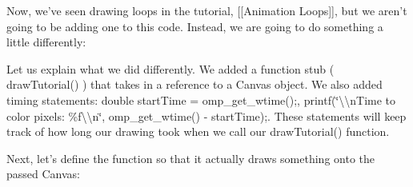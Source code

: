 Now, we've seen drawing loops in the tutorial, \mbox{[}\mbox{[}Animation Loops\mbox{]}\mbox{]}, but we aren't going to be adding one to this code. Instead, we are going to do something a little differently\-:




Let us explain what we did differently. We added a function stub ( {\ttfamily draw\-Tutorial()} ) that takes in a reference to a Canvas object. We also added timing statements\-: {\ttfamily double start\-Time = omp\-\_\-get\-\_\-wtime();}, {\ttfamily printf(\char`\"{}\textbackslash{}\textbackslash{}n\-Time to color pixels\-: \%f\textbackslash{}\textbackslash{}n\char`\"{}, omp\-\_\-get\-\_\-wtime() -\/ start\-Time);}. These statements will keep track of how long our drawing took when we call our {\ttfamily draw\-Tutorial()} function.

Next, let's define the function so that it actually draws something onto the passed Canvas\-:


